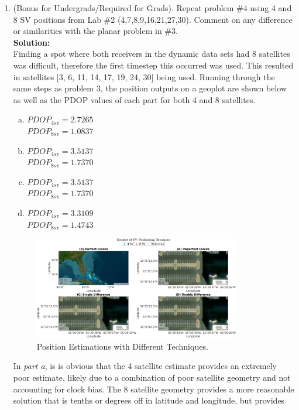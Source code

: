 \documentclass[11pt]{article}
\newcommand{\solution}{\textbf{Solution: \\}}
\begin{document}
\begin{enumerate}[label=\textbf{\arabic*.}]
  \vspace{24pt}
  \item (Bonus for Undergrads/Required for Grads). Repeat problem $\#$4 using 
  4 and 8 SV positions from Lab $\#$2 (4,7,8,9,16,21,27,30). Comment on any 
  difference or similarities with the planar problem in $\#$3.\\
  \solution
  Finding a spot where both receivers in the dynamic data sets had 8 satellites 
  was difficult, therefore the first timestep this occurred was used. This 
  resulted in satellites [3, 6, 11, 14, 17, 19, 24, 30] being used. Running 
  through the same steps as problem 3, the position outputs on a geoplot are 
  shown below as well as the PDOP values of each part for both 4 and 8 satellites.
  \begin{enumerate}[(a)]
    \itemsep -2pt
    \item $PDOP_{4sv} = 2.7265$ \\ $PDOP_{8sv} = 1.0837$
    \item $PDOP_{4sv} = 3.5137$ \\ $PDOP_{8sv} = 1.7370$
    \item $PDOP_{4sv} = 3.5137$ \\ $PDOP_{8sv} = 1.7370$
    \item $PDOP_{4sv} = 3.3109$ \\ $PDOP_{8sv} = 1.4743$
  \end{enumerate}
  \begin{figure}[H]
    \centering
    \includegraphics[width=0.85\textwidth]{5.png}
    \caption{Position Estimations with Different Techniques.}
  \end{figure}
  In \emph{part a}, is is obvious that the 4 satellite estimate provides an extremely 
  poor estimate, likely due to a combination of poor satellite geometry and not 
  accounting for clock bias. The 8 satellite geometry provides a more reasonable 
  solution that is tenths or degrees off in latitude and longitude, but provides 

\end{enumerate}
\end{document}
